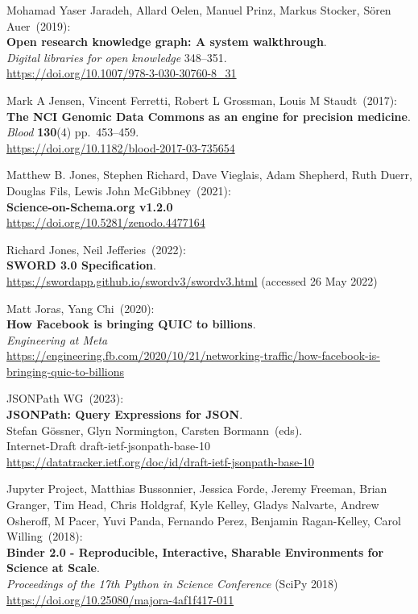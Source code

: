 \begin{thebibliography}{9}
Mohamad Yaser Jaradeh, Allard Oelen, Manuel Prinz, Markus Stocker, Sören Auer~(2019): \\
\textbf{Open research knowledge graph: A system walkthrough}. \\
\emph{Digital libraries for open knowledge} 348--351.\\
\url{https://doi.org/10.1007/978-3-030-30760-8_31}

Mark A Jensen, Vincent Ferretti, Robert L Grossman, Louis M Staudt~(2017): \\
\textbf{The NCI Genomic Data Commons as an engine for precision medicine}.\\
\emph{Blood} \textbf{130}(4) pp.~453--459.\\
\url{https://doi.org/10.1182/blood-2017-03-735654}

Matthew B. Jones, Stephen Richard, Dave Vieglais, Adam Shepherd, Ruth Duerr, Douglas Fils, Lewis John McGibbney~(2021): \\
\textbf{Science-on-Schema.org v1.2.0}\\
\url{https://doi.org/10.5281/zenodo.4477164}

Richard Jones, Neil Jefferies~(2022): \\
\textbf{SWORD 3.0 Specification}. \\
\url{https://swordapp.github.io/swordv3/swordv3.html} (accessed 26 May 2022)

Matt Joras, Yang Chi~(2020): \\
\textbf{How Facebook is bringing QUIC to billions}.\\
\emph{Engineering at Meta}\\
\url{https://engineering.fb.com/2020/10/21/networking-traffic/how-facebook-is-bringing-quic-to-billions}

JSONPath WG~(2023): \\
\textbf{JSONPath: Query Expressions for JSON}.\\
Stefan Gössner, Glyn Normington, Carsten Bormann~(eds).\\
Internet-Draft draft-ietf-jsonpath-base-10\\
\url{https://datatracker.ietf.org/doc/id/draft-ietf-jsonpath-base-10}

Jupyter Project, Matthias Bussonnier, Jessica Forde, Jeremy Freeman, Brian Granger, Tim Head, Chris Holdgraf, Kyle Kelley, Gladys Nalvarte, Andrew Osheroff, M Pacer, Yuvi Panda, Fernando Perez, Benjamin Ragan-Kelley, Carol Willing~(2018): \\
\textbf{Binder 2.0 - Reproducible, Interactive, Sharable Environments for Science at Scale}.\\
\emph{Proceedings of the 17th Python in Science Conference} (SciPy 2018)\\
\url{https://doi.org/10.25080/majora-4af1f417-011}


\end{thebibliography}
